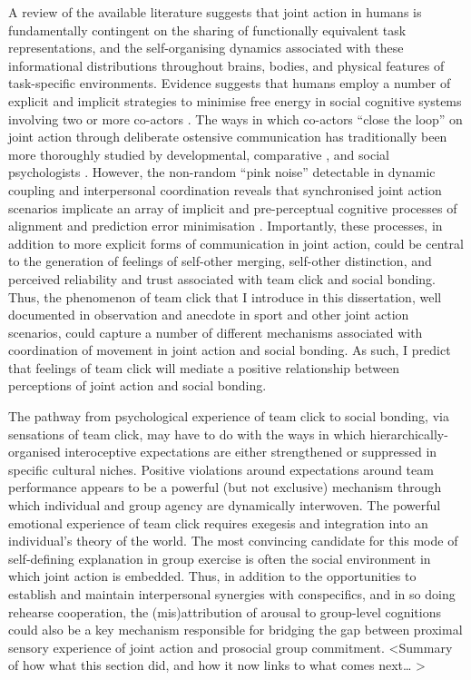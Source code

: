A review of the available literature suggests that joint action in humans is fundamentally contingent on the sharing of functionally equivalent task representations, and the self-organising dynamics associated with these informational distributions throughout brains, bodies, and physical features of task-specific environments.  Evidence suggests that humans employ a number of explicit and implicit strategies to minimise free energy in social cognitive systems involving two or more co-actors \citep{Semin2008,Frith2010}. The ways in which co-actors ``close the loop'' \citep{Frith2007} on joint action through deliberate ostensive communication has traditionally been more thoroughly studied by developmental, comparative \cite{Tomasello2005a}, and social psychologists \citep{Sebanz2006}.
However, the non-random ``pink noise'' detectable in dynamic coupling and interpersonal coordination reveals that synchronised joint action scenarios implicate an array of implicit and pre-perceptual cognitive processes of alignment and prediction error minimisation \citep{Schmidt2011}. Importantly, these processes, in addition to more explicit forms of communication in joint action, could be central to the generation of feelings of self-other merging, self-other distinction, and perceived reliability and trust associated with team click and social bonding.  Thus, the phenomenon of team click that I introduce in this dissertation, well documented in observation and anecdote in sport and other joint action scenarios, could capture a number of different mechanisms associated with coordination of movement in joint action and social bonding.  As such, I predict that feelings of team click will mediate a positive relationship between perceptions of joint action and social bonding.

The pathway from psychological experience of team click to social bonding, via sensations of team click, may have to do with the ways in which hierarchically-organised interoceptive expectations are either strengthened or suppressed in specific cultural niches.  Positive violations around expectations around team performance appears to be a powerful (but not exclusive) mechanism through which individual and group agency are dynamically interwoven.
The powerful emotional experience of team click requires exegesis and integration into an individual's theory of the world.  The most convincing candidate for this mode of self-defining explanation in group exercise is often the social environment in which joint action is embedded.  Thus, in addition to the opportunities to establish and maintain interpersonal synergies with conspecifics, and in so doing rehearse cooperation, the (mis)attribution of arousal \citep{Drachman1976} to group-level cognitions could also be a key mechanism responsible for bridging the gap between proximal sensory experience of joint action and prosocial group commitment.
<Summary of how what this section did, and how it now links to what comes next… >

